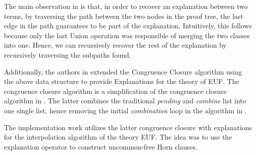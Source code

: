 The main observation in \cite{10.1007/978-3-540-32033-3_33} 
is that, in order to recover an explanation between 
two terms, by traversing the path between the two nodes 
in the proof tree, the last edge in the path guarantees to 
be part of the explanation. Intuitively, this follows 
because only 
the last Union operation was responsible of merging the 
two classes into one. Hence, we can recursively recover 
the rest of the explanation by recursively traversing 
the subpaths found.

Additionally, the authors in 
\cite{10.1007/978-3-540-32033-3_33} 
extended the Congruence Closure algorithm 
\cite{10.1007/978-3-540-39813-4_5} using the above data 
structure to provide Explanations for the theory of EUF.  
The congruence closure algorithm is a 
simplification of the congruence 
closure algorithm in \cite{10.1145/322217.322228}. The latter 
combines the traditional \emph{pending} and \emph{combine} list 
into one single list, hence removing the initial 
\emph{combination} loop in the algorithm in 
\cite{10.1145/322217.322228}.

The implementation work utilizes the latter congruence closure
with explanations for the interpolation algorithm of the 
theory EUF. The idea was to use the explanation operator
to construct uncommon-free Horn clauses.

